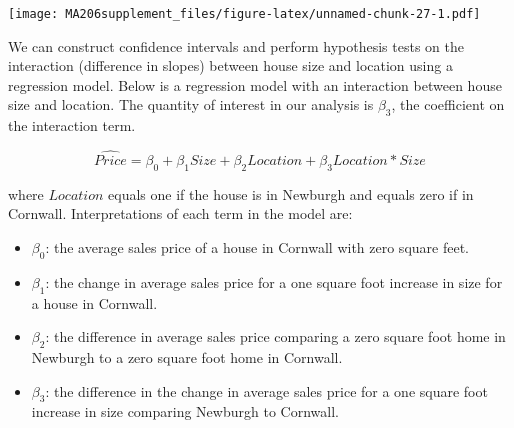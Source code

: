 \documentclass[
]{book}
\newenvironment{Shaded}{\begin{snugshade}}{\end{snugshade}}
\newcommand{\AttributeTok}[1]{\textcolor[rgb]{0.77,0.63,0.00}{#1}}
\newcommand{\ConstantTok}[1]{\textcolor[rgb]{0.00,0.00,0.00}{#1}}
\newcommand{\FunctionTok}[1]{\textcolor[rgb]{0.00,0.00,0.00}{#1}}
\newcommand{\NormalTok}[1]{#1}
\newcommand{\SpecialCharTok}[1]{\textcolor[rgb]{0.00,0.00,0.00}{#1}}
\newcommand{\StringTok}[1]{\textcolor[rgb]{0.31,0.60,0.02}{#1}}
\begin{document}
\begin{Shaded}
\end{Shaded}

\texttt{[image: MA206supplement\_files/figure-latex/unnamed-chunk-27-1.pdf]}

We can construct confidence intervals and perform hypothesis tests on the interaction (difference in slopes) between house size and location using a regression model. Below is a regression model with an interaction between house size and location. The quantity of interest in our analysis is \(\beta_3\), the coefficient on the interaction term.

\[\widehat{Price} = \beta_0 + \beta_1 Size + \beta_2 Location + \beta_3 Location * Size\]

where \(Location\) equals one if the house is in Newburgh and equals zero if in Cornwall. Interpretations of each term in the model are:

\begin{itemize}
\item
  \(\beta_0\): the average sales price of a house in Cornwall with zero square feet.
\item
  \(\beta_1\): the change in average sales price for a one square foot increase in size for a house in Cornwall.
\item
  \(\beta_2\): the difference in average sales price comparing a zero square foot home in Newburgh to a zero square foot home in Cornwall.
\item
  \(\beta_3\): the difference in the change in average sales price for a one square foot increase in size comparing Newburgh to Cornwall.
\end{itemize}
\end{document}
